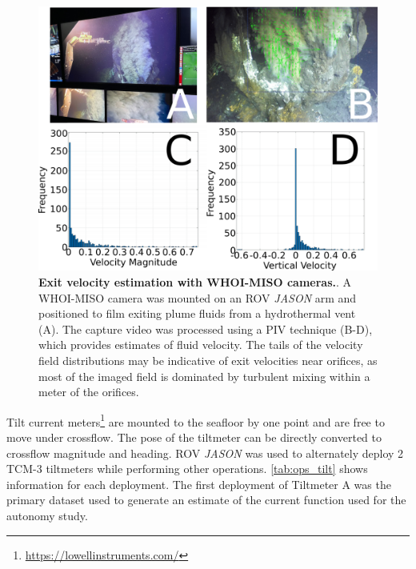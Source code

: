 \begin{figure}[h!]
  \centering
  \includegraphics[width=0.8\columnwidth]{figures/ops_miso.png}
  \caption[Exit velocity estimation with WHOI-MISO cameras]{\textbf{Exit velocity estimation with WHOI-MISO cameras.}. A WHOI-MISO camera was mounted on an ROV \emph{JASON} arm and positioned to film exiting plume fluids from a hydrothermal vent (A). The capture video was processed using a PIV technique (B-D), which provides estimates of fluid velocity. The tails of the velocity field distributions may be indicative of exit velocities near orifices, as most of the imaged field is dominated by turbulent mixing within a meter of the orifices.}
  \label{fig:ops_miso}
\end{figure}

Tilt current meters\footnote{\url{https://lowellinstruments.com/}} are mounted to the seafloor by one point and are free to move under crossflow. The pose of the tiltmeter can be directly converted to crossflow magnitude and heading. ROV \emph{JASON} was used to alternately deploy 2 TCM-3 tiltmeters while performing other operations. \cref{tab:ops_tilt} shows information for each deployment. The first deployment of Tiltmeter A was the primary dataset used to generate an estimate of the current function used for the autonomy study. 

